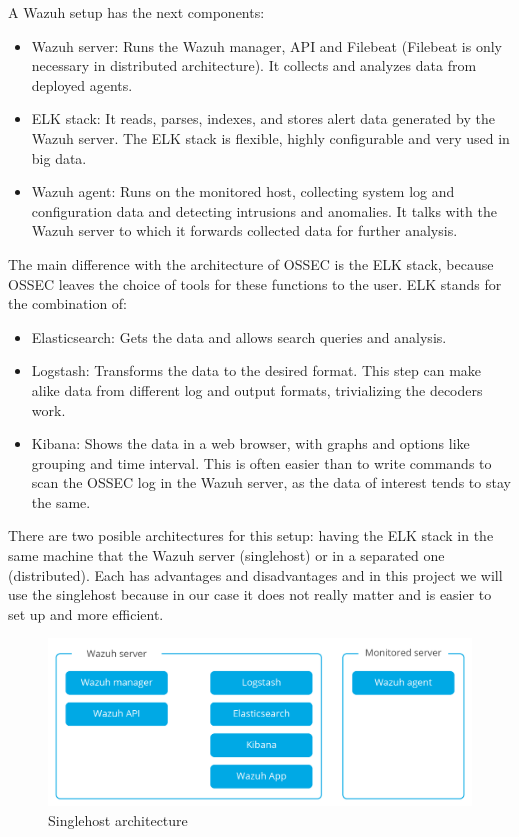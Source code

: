 A Wazuh setup has the next components\cite{wazuh_architecture}:
\begin{itemize}
	\item Wazuh server: Runs the Wazuh manager, API and Filebeat (Filebeat is only necessary in distributed architecture). It collects and analyzes data from deployed agents.
	\item ELK stack: It reads, parses, indexes, and stores alert data generated by the Wazuh server. The ELK stack is flexible, highly configurable and very used in big data.
	\item Wazuh agent: Runs on the monitored host, collecting system log and configuration data and detecting intrusions and anomalies. It talks with the Wazuh server to which it forwards collected data for further analysis.
\end{itemize}
\linej
The main difference with the architecture of OSSEC is the ELK stack, because OSSEC leaves the choice of tools for these functions to the user. ELK stands for the combination of:
\begin{itemize}
	\item Elasticsearch: Gets the data and allows search queries and analysis.
	\item Logstash: Transforms the data to the desired format. This step can make alike data from different log and output formats, trivializing the decoders work.
	\item Kibana: Shows the data in a web browser, with graphs and options like grouping and time interval. This is often easier than to write commands to scan the OSSEC log in the Wazuh server, as the data of interest tends to stay the same.
\end{itemize}
\linej
There are two posible architectures for this setup: having the ELK stack in the same machine that the Wazuh server (singlehost) or in a separated one (distributed). Each has advantages and disadvantages and in this project we will use the singlehost because in our case it does not really matter and is easier to set up and more efficient.
\begin{figure}[H]
  \centering
	\includegraphics[width=\textwidth]{figuras/wazuh_singlehost.png}
	\caption{Singlehost architecture}
\end{figure}


